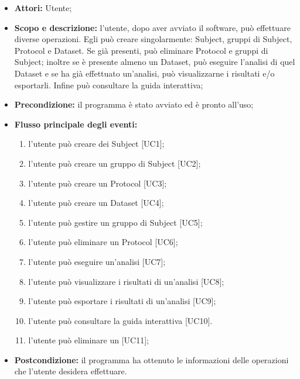 \begin{itemize}
\item \textbf{Attori:} Utente;
\item \textbf{Scopo e descrizione:} l'utente, dopo aver avviato il software, può effettuare diverse operazioni. Egli può creare singolarmente: Subject\glossario{}, gruppi di Subject\glossario{}, Protocol\glossario{} e Dataset\glossario{}. Se già presenti, può eliminare Protocol\glossario{} e gruppi di Subject\glossario{}; inoltre se è presente almeno un Dataset\glossario{}, può eseguire l'analisi di quel Dataset\glossario{} e se ha già effettuato un'analisi, può visualizzarne i risultati e/o esportarli. Infine può consultare la guida interattiva;
\item \textbf{Precondizione:} il programma è stato avviato ed è pronto all'uso;
\item \textbf{Flusso principale degli eventi:} 
\begin{enumerate}
\item l'utente può creare dei Subject\glossario{} [UC1];
\item l'utente può creare un gruppo di Subject\glossario{} [UC2];
\item l'utente può creare un Protocol\glossario{} [UC3];
\item l'utente può creare un Dataset\glossario{} [UC4];
\item l'utente può gestire un gruppo di Subject\glossario{} [UC5];
\item l'utente può eliminare un Protocol\glossario{} [UC6];
\item l'utente può eseguire un'analisi [UC7];
\item l'utente può visualizzare i risultati di un'analisi [UC8];
\item l'utente può esportare i risultati di un'analisi [UC9];
\item l'utente può consultare la guida interattiva [UC10].
\item l'utente può eliminare un \dataset{} [UC11];
\end{enumerate}
\item \textbf{Postcondizione:} il programma ha ottenuto le informazioni delle operazioni che l'utente desidera effettuare.
\end{itemize}

